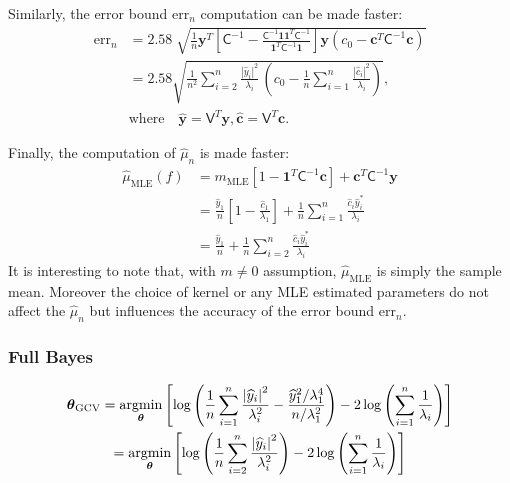 \documentclass[smallextended]{svjour3}       %
\newcommand{\bm}[1]{\boldsymbol{#1}}
\newcommand{\trace}[1]{\textup{trace}{#1}}
\newcommand{\vtheta}{{\bm{\theta}}}
\newcommand{\vc}{\bm{c}}
\newcommand{\vy}{\bm{y}}
\newcommand{\vone}{\bm{1}}
\newcommand{\mC}{\mathsf{C}}
\newcommand{\mCInv}{{\mathsf{C}^{-1}}}
\newcommand{\mV}{\mathsf{V}}
\newcommand{\hmu}{\hat{\mu}}
\newcommand{\MLE}{\text{MLE}}
\newcommand{\errn}{\text{err}_{n}}
\def\abs#1{\ensuremath{\left \lvert #1 \right \rvert}}
\providecommand{\argmin}{\operatorname*{argmin}}
\begin{document}
Similarly, the error bound {$\errn$} computation can be made faster:
\begin{align*}
\errn &=
2.58 \; \sqrt{ 
\frac{1}{n}
\vy^T 
\left[ 
\mCInv - 
\frac{ \mCInv \vone \vone^T \mCInv }{\vone^T\mCInv \vone}
\right] \vy
(c_0 - \vc^T\mC^{-1}\vc) } 
\\
&
=
{{
\displaystyle
{
2.58\sqrt{
\frac {1}{n^2} \sum_{i=2}^{n} \frac{\abs{\widehat{y}_i}^2}{\lambda_i}  
\,
\left( c_0 - \frac 1n \sum_{i=1}^n \frac{\abs{\widehat{c}_i}^2}{\lambda_i} \right) 
}
}
}}, 
\\
\nonumber
& \text{where} \quad 
\widehat{\vy} = \mV^T \vy,  
\widehat{\vc} = \mV^T \vc. 
\end{align*}




Finally, the computation of $\hmu_n$ is made faster:
\begin{align}
\nonumber
\hmu_\MLE(f) &= m_\MLE[1 - \vone^T  \mC^{-1}\vc ]
+
\vc^T \mC^{-1} \vy
\\
\nonumber
&= \frac{\widehat{y}_1}{n} \left[1 - \frac{\widehat{c}_1}{\lambda_1}\right]
+ \frac 1n \sum_{i=1}^n \frac{ \widehat{c}_i \widehat{y}_i^*}{\lambda_i}
\\
\label{eqn:hmu_complicated}
& =
 \frac{\widehat{y}_1}{n} +
 \frac 1n \sum_{i=2}^n \frac{ \widehat{c}_i \widehat{y}_i^*}{\lambda_i}
\end{align}
It is interesting to note that, with $m \neq 0$ assumption, $\hmu_\MLE$ is simply the sample mean. 
Moreover the choice of kernel or any MLE estimated parameters do not affect the $\hmu_n$ but influences the accuracy of the error bound $\errn$.

\subsubsection{Full Bayes}


\begin{gather}
\nonumber
\vtheta_{\textup{GCV}} 
= \argmin_\vtheta \left[ \log \left ( \frac 1n \sum_{i=1}^n \frac{\abs{\widehat{y}_i}^2}{\lambda_i^2} - 
\frac{\widehat{y}_1^2/\lambda_1^4}{n/\lambda^2_1}
\right) -2\log\left( \sum_{i=1}^n \frac{1}{\lambda_i} \right)
\right]
\\
= \argmin_\vtheta \left[ \log \left ( \frac 1n \sum_{i=2}^n \frac{\abs{\widehat{y}_i}^2}{\lambda_i^2} 
\right) -2\log\left( \sum_{i=1}^n \frac{1}{\lambda_i} \right)
\right]
\end{gather}
\end{document}

